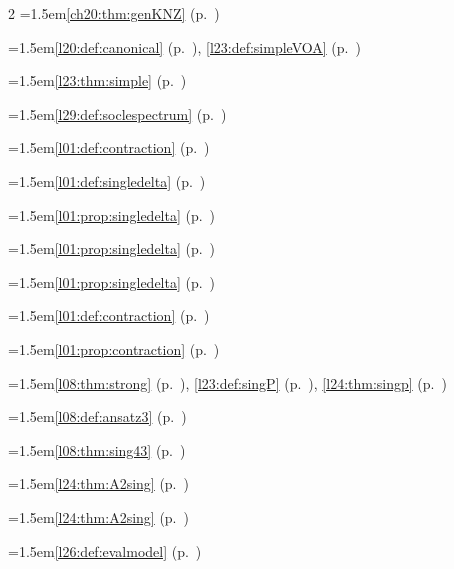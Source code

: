 \begin{multicols}{2}
\hangindent=1.5em\quad \ref{ch20:thm:genKNZ} (p.~\pageref{ch20:thm:genKNZ})\par
\hangindent=1.5em\quad \ref{l20:def:canonical} (p.~\pageref{l20:def:canonical}), \ref{l23:def:simpleVOA} (p.~\pageref{l23:def:simpleVOA})\par
\hangindent=1.5em\quad \ref{l23:thm:simple} (p.~\pageref{l23:thm:simple})\par
\hangindent=1.5em\quad \ref{l29:def:soclespectrum} (p.~\pageref{l29:def:soclespectrum})\par
\hangindent=1.5em\quad \ref{l01:def:contraction} (p.~\pageref{l01:def:contraction})\par
\hangindent=1.5em\quad \ref{l01:def:singledelta} (p.~\pageref{l01:def:singledelta})\par
\hangindent=1.5em\quad \ref{l01:prop:singledelta} (p.~\pageref{l01:prop:singledelta})\par
\hangindent=1.5em\quad \ref{l01:prop:singledelta} (p.~\pageref{l01:prop:singledelta})\par
\hangindent=1.5em\quad \ref{l01:prop:singledelta} (p.~\pageref{l01:prop:singledelta})\par
\hangindent=1.5em\quad \ref{l01:def:contraction} (p.~\pageref{l01:def:contraction})\par
\hangindent=1.5em\quad \ref{l01:prop:contraction} (p.~\pageref{l01:prop:contraction})\par
\hangindent=1.5em\quad \ref{l08:thm:strong} (p.~\pageref{l08:thm:strong}), \ref{l23:def:singP} (p.~\pageref{l23:def:singP}), \ref{l24:thm:singp} (p.~\pageref{l24:thm:singp})\par
\hangindent=1.5em\quad \ref{l08:def:ansatz3} (p.~\pageref{l08:def:ansatz3})\par
\hangindent=1.5em\quad \ref{l08:thm:sing43} (p.~\pageref{l08:thm:sing43})\par
\hangindent=1.5em\quad \ref{l24:thm:A2sing} (p.~\pageref{l24:thm:A2sing})\par
\hangindent=1.5em\quad \ref{l24:thm:A2sing} (p.~\pageref{l24:thm:A2sing})\par
\hangindent=1.5em\quad \ref{l26:def:evalmodel} (p.~\pageref{l26:def:evalmodel})\par

\end{multicols}
